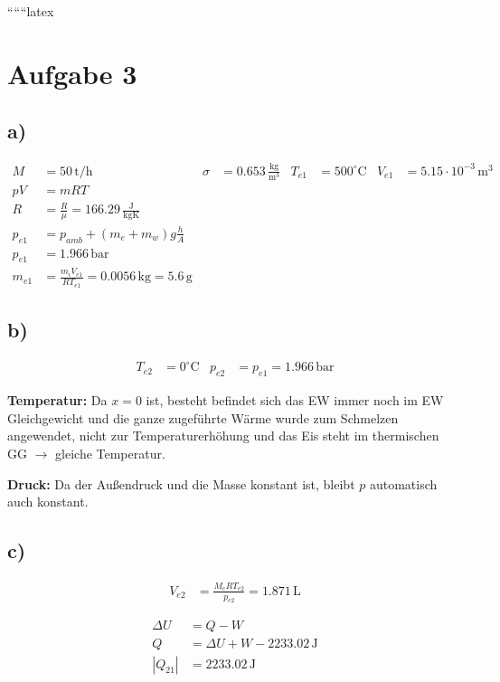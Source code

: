 
``````latex


\section*{Aufgabe 3}

\subsection*{a)}
\begin{align*}
M &= 50 \, \text{t/h} & \sigma &= 0.653 \, \frac{\text{kg}}{\text{m}^3} & T_{e1} &= 500^\circ \text{C} & V_{e1} &= 5.15 \cdot 10^{-3} \, \text{m}^3 \\
pV &= mRT \\
R &= \frac{R}{\mu} = 166.29 \, \frac{\text{J}}{\text{kgK}} \\
p_{e1} &= p_{amb} + (m_e + m_w) g \frac{h}{A} \\
p_{e1} &= 1.966 \, \text{bar} \\
m_{e1} &= \frac{m_i V_{e1}}{R T_{e1}} = 0.0056 \, \text{kg} = 5.6 \, \text{g}
\end{align*}

\subsection*{b)}
\begin{align*}
T_{e2} &= 0^\circ \text{C} & p_{e2} &= p_{e1} = 1.966 \, \text{bar}
\end{align*}

\textbf{Temperatur:} Da $x = 0$ ist, besteht befindet sich das EW immer noch im EW Gleichgewicht und die ganze zugeführte Wärme wurde zum Schmelzen angewendet, nicht zur Temperaturerhöhung und das Eis steht im thermischen GG $\rightarrow$ gleiche Temperatur.

\textbf{Druck:} Da der Außendruck und die Masse konstant ist, bleibt $p$ automatisch auch konstant.

\subsection*{c)}
\begin{align*}
V_{e2} &= \frac{M_e R T_{e2}}{p_{e2}} = 1.871 \, \text{L}
\end{align*}

\begin{align*}
\Delta U &= Q - W \\
Q &= \Delta U + W - 2233.02 \, \text{J} \\
|Q_{21}| &= 2233.02 \, \text{J}
\end{align*}

